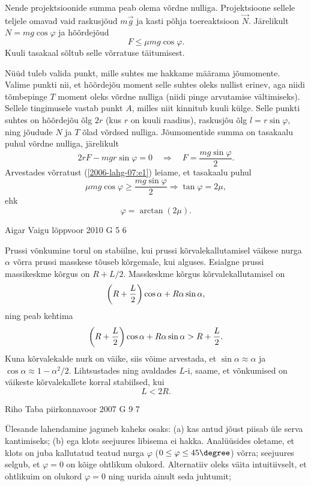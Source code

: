\documentclass[11pt]{article}
\begin{document}
{{Nende projektsioonide summa peab olema võrdne nulliga. Projektsioone sellele teljele omavad vaid raskusjõud $m\vec g$ ja kasti põhja toereaktsioon $\vec N$. Järelikult
$N = mg \cos \varphi$ ja hõõrdejõud
\begin{equation} \label{2006-lahg-07:e1}
F \leq \mu mg \cos\varphi.
\end{equation}
Kuuli tasakaal sõltub selle võrratuse täitumisest.

Nüüd tuleb valida punkt, mille suhtes me hakkame määrama jõumomente. Valime punkti nii, et hõõrdejõu moment selle suhtes oleks nullist erinev, aga niidi tõmbepinge $T$ moment oleks võrdne nulliga (niidi pinge arvutamise vältimiseks). Sellele tingimusele vastab punkt $A$, milles niit kinnitub kuuli külge. Selle punkti suhtes on hõõrdejõu õlg $2r$ (kus $r$ on kuuli raadius), raskusjõu õlg $l = r \sin \varphi$, ning jõudude $N$ ja $T$ õlad võrdsed nulliga. Jõumomentide summa on tasakaalu puhul võrdne nulliga, järelikult
\[
2 r F-m g r \sin \varphi=0 \quad \Rightarrow \quad F=\frac{m g \sin \varphi}{2}.
\]
Arvestades võrratust (\ref{2006-lahg-07:e1}) leiame, et tasakaalu puhul
\[
\mu m g \cos \varphi \geq \frac{m g \sin \varphi}{2} \Rightarrow \tan \varphi=2 \mu,
\]
ehk
\[
\varphi = \arctan (2\mu).
\]
\fi
}

{Aigar Vaigu} %
{lõppvoor} %
{2010} %
{G 5} %
{6} %
{

\ifSolution
Prussi võnkumine torul on stabiilne, kui prussi
kõrvalekallutamisel väikese nurga $\alpha$ võrra prussi masskese
tõuseb kõrgemale, kui alguses. Esialgne prussi massikeskme kõrgus on $R+L/2$.
Masskeskme kõrgus kõrvalekallutamisel on
\[\left(R+{L \over 2}\right)\cos\alpha+R\alpha\sin\alpha,\]
ning peab kehtima
\[\left(R+{L \over 2}\right)\cos\alpha+R\alpha\sin\alpha >R+{L \over 2}.\]
Kuna kõrvalekalde nurk on väike, siis võime arvestada, et
$\sin\alpha\approx \alpha$ ja $\cos\alpha\approx 1-\alpha^2/2$. Lihtsustades ning avaldades $L$-i, saame, et võnkumised on väikeste kõrvalekallete korral stabiilsed, kui
\[L<2R.\]
\fi
}

{Riho Taba} %
{piirkonnavoor} %
{2007} %
{G 9} %
{7} %
{

\ifSolution
Ülesande lahendamine jaguneb kaheks osaks: (a) kas antud jõust piisab üle serva kantimiseks; (b) ega klots seejuures libisema ei hakka. Analüüsides oletame, et klots on juba kallutatud teatud nurga $\varphi$ ($0 \leq \varphi \leq 45\degree$) võrra; seejuures selgub, et $\varphi = 0$ on kõige ohtlikum olukord. Alternatiiv oleks väita intuitiivselt, et ohtlikuim on olukord $\varphi = 0$ ning uurida ainult seda juhtumit;

}}
\end{document}
